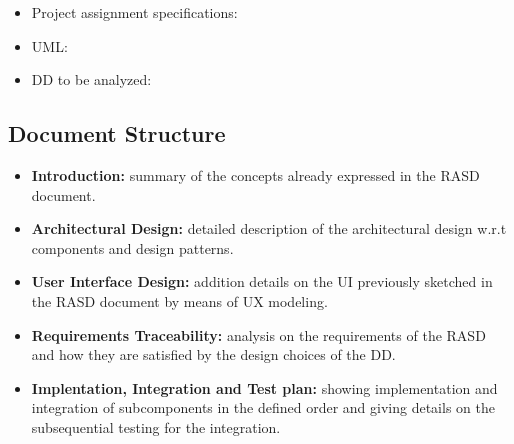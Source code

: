\begin{itemize}

\item Project assignment specifications:\cite{ASSIGNMENT}

\item UML: \cite{UML}

\item DD to be analyzed: \cite{DD}

\end{itemize}


\subsection{Document Structure}

\begin{itemize}

\item \textbf{Introduction:} summary of the concepts already expressed in the RASD document.
\item \textbf{Architectural Design:} detailed description of the architectural design w.r.t components and design patterns.
\item \textbf{User Interface Design:} addition details on the UI previously sketched in the RASD document by means of UX modeling.
\item \textbf{Requirements Traceability:} analysis on the requirements of the RASD and how they are satisfied by the design choices of the DD.
\item \textbf{Implentation, Integration and Test plan:} showing implementation and integration of subcomponents in the defined order and giving details on the subsequential testing for the integration.

\end{itemize}